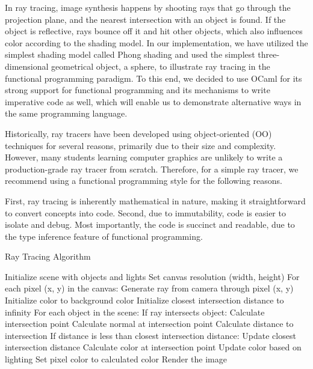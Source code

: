 \documentclass[conference]{IEEEtran}
\begin{document}
In ray tracing, image synthesis happens by shooting rays that go through the projection plane, and the nearest intersection with an object is found. If the object is reflective, rays bounce off it and hit other objects, which also influences color according to the shading model\cite{kevin}. In our implementation\cite{mycode}, we have utilized the simplest shading model called Phong shading\cite{peter} and used the simplest three-dimensional geometrical object, a sphere, to illustrate ray tracing in the functional programming paradigm. To this end, we decided to use OCaml for its strong support for functional programming and its mechanisms to write imperative code as well, which will enable us to demonstrate alternative ways in the same programming language.


Historically, ray tracers have been developed using object-oriented (OO) techniques for several reasons, primarily due to their size and complexity. However, many students learning computer graphics are unlikely to write a production-grade ray tracer from scratch. Therefore, for a simple ray tracer, we recommend using a functional programming style for the following reasons.

First, ray tracing is inherently mathematical in nature, making it straightforward to convert concepts into code. Second, due to immutability, code is easier to isolate and debug. Most importantly, the code is succinct and readable, due to the type inference feature of functional programming.

\begin{algorithm}
  \caption{Ray Tracing Algorithm}
  \begin{algorithmic}[1]
      \STATE Initialize scene with objects and lights
      \STATE Set canvas resolution (width, height)
      \STATE For each pixel (x, y) in the canvas:
          \STATE \quad Generate ray from camera through pixel (x, y)
          \STATE \quad Initialize color to background color
          \STATE \quad Initialize closest intersection distance to infinity
          \STATE \quad For each object in the scene:
              \STATE \quad \quad If ray intersects object:
                  \STATE \quad \quad \quad Calculate intersection point
                  \STATE \quad \quad \quad Calculate normal at intersection point
                  \STATE \quad \quad \quad Calculate distance to intersection
                  \STATE \quad \quad \quad If distance is less than closest intersection distance:
                      \STATE \quad \quad \quad \quad Update closest intersection distance
                      \STATE \quad \quad \quad \quad Calculate color at intersection point
                      \STATE \quad \quad \quad \quad Update color based on lighting
          \STATE \quad Set pixel color to calculated color
      \STATE Render the image
  \end{algorithmic}
\end{algorithm}
\end{document}
